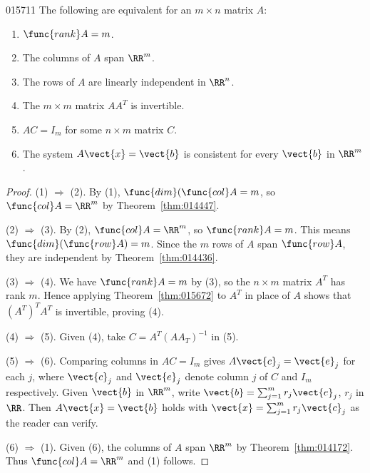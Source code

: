 \begin{theorem}{}{015711} %
The following are equivalent for an $m \times n$ matrix $A$:

\begin{enumerate}
\item $\func{rank} A = m$.

\item The columns of $A$ span $\RR^m$.

\item The rows of $A$ are linearly independent in $\RR^n$.

\item The $m \times m$ matrix $AA^T$ is invertible.

\item $AC = I_m$ for some $n \times m$ matrix $C$.

\item The system $A\vect{x} = \vect{b}$ is consistent for every $\vect{b}$ in $\RR^m$.

\end{enumerate}
\end{theorem}

\begin{proof}
(1) $\Rightarrow$ (2). By (1), $\func{dim}(\func{col} A = m$, so $\func{col} A = \RR^m$ by Theorem~\ref{thm:014447}.

(2) $\Rightarrow$ (3). By (2), $\func{col} A = \RR^m$, so $\func{rank} A = m$. This means $\func{dim}(\func{row} A) = m$. Since the $m$ rows of $A$ span $\func{row} A$, they are independent by Theorem~\ref{thm:014436}.

(3) $\Rightarrow$ (4). We have $\func{rank} A = m$ by (3), so the $n \times m$ matrix $A^{T}$ has rank $m$. Hence applying Theorem~\ref{thm:015672} to $A^{T}$ in place of $A$ shows that $(A^{T})^{T}A^{T}$ is invertible, proving (4).

(4) $\Rightarrow$ (5). Given (4), take $C = A^{T}(AA_{T})^{-1}$ in (5).

(5) $\Rightarrow$ (6). Comparing columns in $AC = I_{m}$ gives $A\vect{c}_{j} = \vect{e}_{j}$ for each $j$, where $\vect{c}_{j}$ and $\vect{e}_{j}$ denote column $j$ of $C$ and $I_{m}$ respectively. Given $\vect{b}$ in $\RR^m$, write $\vect{b} = \sum_{j=1}^{m} r_j\vect{e}_j$, $r_{j}$ in $\RR$. Then $A\vect{x} = \vect{b}$ holds with $\vect{x}= \sum_{j=1}^{m} r_j\vect{c}_j $ as the reader can verify.

(6) $\Rightarrow$ (1). Given (6), the columns of $A$ span $\RR^m$ by Theorem~\ref{thm:014172}. Thus $\func{col} A = \RR^m$ and (1) follows.
\end{proof}

